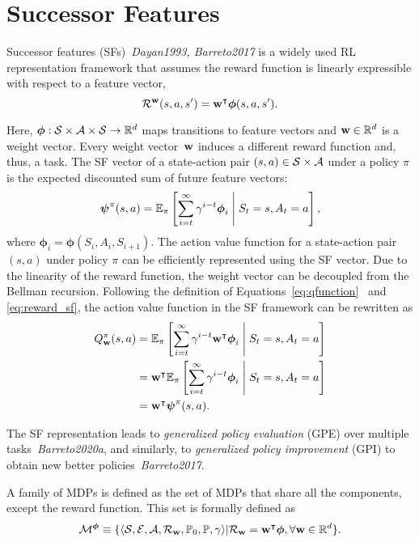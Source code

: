 \section{Successor Features}

Successor features (SFs)~\textit{Dayan1993, Barreto2017} is a widely used RL representation framework that assumes the reward function is linearly expressible with respect to a feature vector,
\begin{equation}
  \mathcal{R}^{\mathbf{w}}(s, a, s') = \mathbf{w}^\intercal\boldsymbol\phi(s, a , s').
  \label{eq:reward_sf}
\end{equation}

Here, $\boldsymbol\phi:\mathcal{S}\times\mathcal{A}\times\mathcal{S}\rightarrow\mathbb{R}^{d}$ maps transitions to feature vectors and $\mathbf{w}\in\mathbb{R}^d$ is a weight vector. Every weight vector~$\mathbf{w}$ induces a different reward function and, thus, a task. The SF vector of a state-action pair $(s,a)\in\mathcal{S}\times\mathcal{A}$ under a policy $\pi$ is the expected discounted sum of future feature vectors: 
\begin{equation}
  \boldsymbol{\mathbf{\psi}}^\pi(s, a) = \mathbb{E}_{\pi}\left[\sum_{i=t}^\infty \gamma^{i-t} \boldsymbol\phi_i\;\middle\lvert\;S_t = s, A_t = a\right],
  \label{eq:sf}
\end{equation}
where $\boldsymbol\phi_i = \boldsymbol\phi(S_{i}, A_{i}, S_{i+1})$. The action value function for a state-action pair $(s, a)$ under policy $\pi$ can be efficiently represented using the SF vector. Due to the linearity of the reward function, the weight vector can be decoupled from the Bellman recursion. Following the definition of Equations~\eqref{eq:qfunction}~ and \eqref{eq:reward_sf}, the action value function in the SF framework can be rewritten as
\begin{align}
  Q^\pi_{\mathbf{w}}(s, a) &= \mathbb{E}_{\pi}\left[\sum_{i=t} ^\infty \gamma^{i-t} \mathbf{w}^\intercal\boldsymbol\phi_i\;\middle\lvert\;S_t = s, A_t = a\right] \nonumber \\
                 & = \mathbf{w}^\intercal\mathbb{E}_{\pi}\left[\sum_{i=t} ^\infty \gamma^{i-t} \boldsymbol\phi_i\;\middle\lvert\;S_t = s, A_t = a\right] \nonumber \\
                 &=  \mathbf{w}^\intercal \boldsymbol{\mathbf{\psi}}^\pi(s, a) .
\label{eq:qfunction_sf}
\end{align}

The SF representation leads to \textit{generalized policy evaluation} (GPE) over multiple tasks~\textit{Barreto2020a}, and similarly, to \textit{generalized policy improvement} (GPI) to obtain new better policies~\textit{Barreto2017}.

A family of MDPs is defined as the set of MDPs that share all the components, except the reward function. This set is formally defined as 
\begin{equation*}
    \mathcal{M}^{\boldsymbol{\phi}}\equiv\{\langle\mathcal{S},\mathcal{E},\mathcal{A},\mathcal{R}_{\mathbf{w}},\mathbb{P}_0, \mathbb{P},\gamma\rangle \lvert \mathcal{R}_{\mathbf{w}} = \mathbf{w}^\intercal \boldsymbol{\phi}, \forall\mathbf{w}\in\mathbb{R}^d\}.
\end{equation*}

